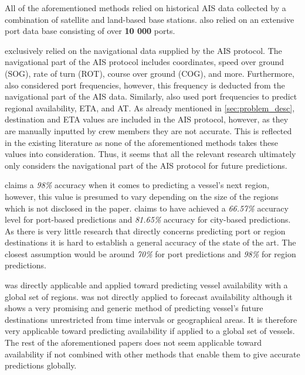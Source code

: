 
All of the aforementioned methods relied on historical AIS data collected by a combination of satellite and land-based base stations. \cite{ZHANG2020102729} also relied on an extensive port data base consisting of over \textbf{10 000} ports.


\cite{ZHANG2020102729} exclusively relied on the navigational data supplied by the AIS protocol. The navigational part of the AIS protocol includes coordinates, speed over ground (SOG), rate of turn (ROT), course over ground (COG), and more. Furthermore, \cite{ZHANG2020102729} also considered port frequencies, however, this frequency is deducted from the navigational part of the AIS data. Similarly, \cite{lechtenberg2019} also used port frequencies to predict regional availability, ETA, and AT. As already mentioned in \cref{sec:problem_desc}, destination and ETA values are included in the AIS protocol, however, as they are manually inputted by crew members they are not accurate. This is reflected in the existing literature as none of the aforementioned methods takes these values into consideration. Thus, it seems that all the relevant research ultimately only considers the navigational part of the AIS protocol for future predictions.


\cite{lechtenberg2019} claims a \textit{98\%} accuracy when it comes to predicting a vessel’s next region, however, this value is presumed to vary depending on the size of the regions which is not disclosed in the paper. \cite{ZHANG2020102729} claims to have achieved a \textit{66.57\%} accuracy level for port-based predictions and \textit{81.65\%} accuracy for city-based predictions. As there is very little research that directly concerns predicting port or region destinations it is hard to establish a general accuracy of the state of the art. The closest assumption would be around \textit{70\%} for port predictions and \textit{98\%} for region predictions.


\cite{lechtenberg2019} was directly applicable and applied toward predicting vessel availability with a global set of regions. \cite{ZHANG2020102729} was not directly applied to forecast availability although it shows a very promising and generic method of predicting vessel’s future destinations unrestricted from time intervals or geographical areas. It is therefore very applicable toward predicting availability if applied to a global set of vessels. The rest of the aforementioned papers does not seem applicable toward availability if not combined with other methods that enable them to give accurate predictions globally.

